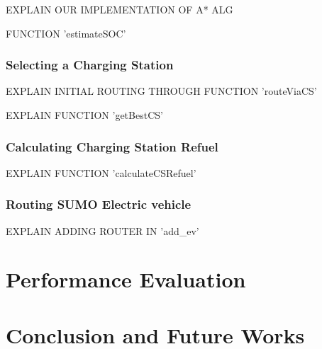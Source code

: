 \documentclass[11pt]{report}
\begin{document}
EXPLAIN OUR IMPLEMENTATION OF A* ALG

FUNCTION 'estimateSOC'

\subsection{Selecting a Charging Station}

EXPLAIN INITIAL ROUTING THROUGH FUNCTION 'routeViaCS'

EXPLAIN FUNCTION 'getBestCS'

\subsection{Calculating Charging Station Refuel}

EXPLAIN FUNCTION 'calculateCSRefuel'

\subsection{Routing SUMO Electric vehicle}

EXPLAIN ADDING ROUTER IN 'add\_ev'

\newpage

\chapter{Performance Evaluation}

\newpage

\chapter{Conclusion and Future Works}

\newpage

\newpage

\printbibliography

\newpage

\listoffigures

\newpage

\listoftables

\newpage

\lstlistoflistings
\end{document}
